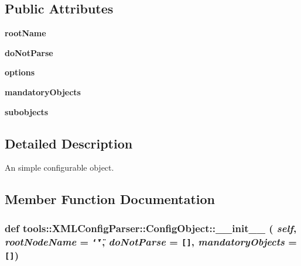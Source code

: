 \subsection*{Public Attributes}
\begin{CompactItemize}
\item 
\hypertarget{classtools_1_1XMLConfigParser_1_1ConfigObject_00284e82b6ab5406ca91d6ffb33e4ddf}{
\textbf{rootName}}
\label{classtools_1_1XMLConfigParser_1_1ConfigObject_00284e82b6ab5406ca91d6ffb33e4ddf}

\item 
\hypertarget{classtools_1_1XMLConfigParser_1_1ConfigObject_dbe854fff96e72df0ab11f74463e0df4}{
\textbf{doNotParse}}
\label{classtools_1_1XMLConfigParser_1_1ConfigObject_dbe854fff96e72df0ab11f74463e0df4}

\item 
\hypertarget{classtools_1_1XMLConfigParser_1_1ConfigObject_8c642c6b47664723d47fbb5d3beb406f}{
\textbf{options}}
\label{classtools_1_1XMLConfigParser_1_1ConfigObject_8c642c6b47664723d47fbb5d3beb406f}

\item 
\hypertarget{classtools_1_1XMLConfigParser_1_1ConfigObject_69bde8a5db8dfe812abb2e0f411c5c9d}{
\textbf{mandatoryObjects}}
\label{classtools_1_1XMLConfigParser_1_1ConfigObject_69bde8a5db8dfe812abb2e0f411c5c9d}

\item 
\hypertarget{classtools_1_1XMLConfigParser_1_1ConfigObject_bcca5d83893ea94d5644bb1af1b67f53}{
\textbf{subobjects}}
\label{classtools_1_1XMLConfigParser_1_1ConfigObject_bcca5d83893ea94d5644bb1af1b67f53}

\end{CompactItemize}


\subsection{Detailed Description}
An simple configurable object. 

\subsection{Member Function Documentation}
\hypertarget{classtools_1_1XMLConfigParser_1_1ConfigObject_da2c248a8db2c816f489af71f314c37c}{
\subsubsection{\setlength{\rightskip}{0pt plus 5cm}def tools::XMLConfigParser::ConfigObject::\_\-\_\-init\_\-\_\- ( {\em self}, \/   {\em rootNodeName} = {\tt \char`\"{}\char`\"{}}, \/   {\em doNotParse} = {\tt \mbox{[}\mbox{]}}, \/   {\em mandatoryObjects} = {\tt \mbox{[}\mbox{]}})}}
\label{classtools_1_1XMLConfigParser_1_1ConfigObject_da2c248a8db2c816f489af71f314c37c}


